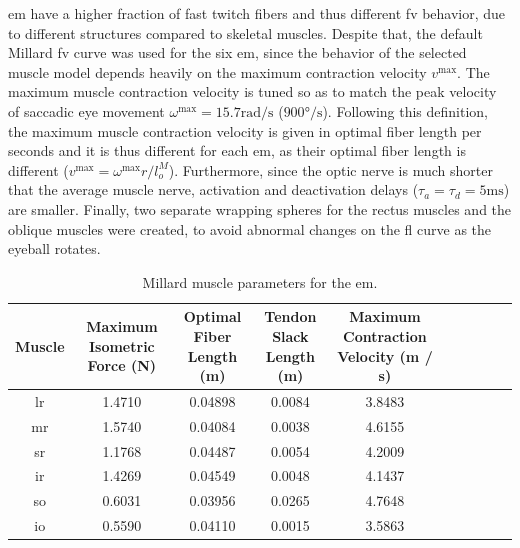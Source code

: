 \documentclass[11pt,a4paper,draft=false]{report}
\begin{document}
\gls{em} have a higher fraction of fast twitch fibers and thus different
\gls{fv} behavior, due to different structures compared to skeletal
muscles. Despite that, the default Millard \gls{fv} curve was used for the six
\gls{em}, since the behavior of the selected muscle model depends heavily on the
maximum contraction velocity $v^{\text{max}}$. The maximum muscle contraction
velocity is tuned so as to match the peak velocity of saccadic eye movement
$\omega^{\text{max}} = 15.7 \si{\radian / \second}$
($900 \si{\degree / \second}$). Following this definition, the maximum muscle
contraction velocity is given in optimal fiber length per seconds and it is thus
different for each \gls{em}, as their optimal fiber length is different
($v^{\text{max}} = \omega^{\text{max}} r / l_o^M$). Furthermore, since the optic
nerve is much shorter that the average muscle nerve, activation and deactivation
delays ($\tau_a = \tau_d = 5 \si{\milli\second}$) are smaller. Finally, two
separate wrapping spheres for the rectus muscles and the oblique muscles were
created, to avoid abnormal changes on the \gls{fl} curve as the eyeball rotates.

\begin{table}[ht]
  \centering
  \caption{Millard muscle parameters for the
    \gls{em}.}\label{tab:muscle-parameters}
  \begin{tabular}{@{}cccccccccc@{}}
    \toprule
    \thead{Muscle \\ \quad}
    & \thead{Maximum Isometric \\ Force (N)}  %
    & \thead{Optimal Fiber \\ Length (m)}
    & \thead{Tendon Slack \\ Length (m)}
    & \thead{Maximum Contraction \\ Velocity (m / s)} \\
    \midrule
    \gls{lr} & 1.4710 & 0.04898 & 0.0084 & 3.8483 \\
    \gls{mr} & 1.5740 & 0.04084 & 0.0038 & 4.6155 \\
    \gls{sr} & 1.1768 & 0.04487 & 0.0054 & 4.2009 \\
    \gls{ir} & 1.4269 & 0.04549 & 0.0048 & 4.1437 \\
    \gls{so} & 0.6031 & 0.03956 & 0.0265 & 4.7648 \\
    \gls{io} & 0.5590 & 0.04110 & 0.0015 & 3.5863 \\
    \bottomrule
  \end{tabular}
\end{table}
\end{document}
